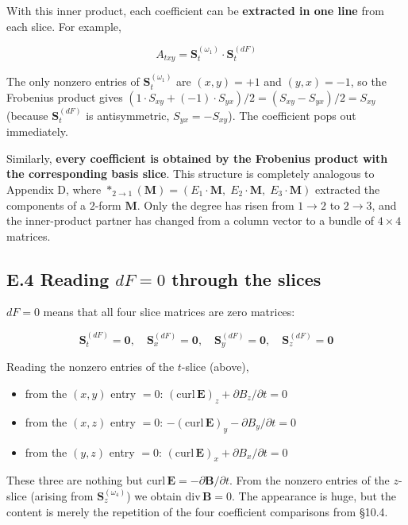 \documentclass[a4paper,12pt,openany]{book}
\begin{document}
With this inner product, each coefficient can be
\textbf{extracted in one line} from each slice. For example,

\[
A_{txy} = \mathbf{S}_{t}^{(\omega_1)} \cdot \mathbf{S}_{t}^{(dF)}
\]

The only nonzero entries of \(\mathbf{S}_{t}^{(\omega_1)}\) are
\((x,y)=+1\) and \((y,x)=-1\), so the Frobenius product gives
\((1 \cdot S_{xy} + (-1) \cdot S_{yx})/2 = (S_{xy} - S_{yx})/2 = S_{xy}\)
(because \(\mathbf{S}_{t}^{(dF)}\) is antisymmetric,
\(S_{yx}=-S_{xy}\)). The coefficient pops out immediately.

Similarly,
\textbf{every coefficient is obtained by the Frobenius product with the corresponding basis slice}.
This structure is completely analogous to Appendix D, where
\(\ast_{2\to1}(\mathbf{M}) = (E_1\!\cdot\!\mathbf{M},\;E_2\!\cdot\!\mathbf{M},\;E_3\!\cdot\!\mathbf{M})\)
extracted the components of a \(2\)-form \(\mathbf{M}\). Only the degree
has risen from \(1\to2\) to \(2\to3\), and the inner-product partner has
changed from a column vector to a bundle of \(4\times4\) matrices.

\hypertarget{e.4-reading-df0-through-the-slices}{%
\subsection*{\texorpdfstring{E.4 Reading \(dF=0\) through the
slices}{E.4 Reading dF=0 through the slices}}\label{e.4-reading-df0-through-the-slices}}

\(dF=0\) means that all four slice matrices are zero matrices:

\[
\mathbf{S}_{t}^{(dF)} = \mathbf{0},\quad
\mathbf{S}_{x}^{(dF)} = \mathbf{0},\quad
\mathbf{S}_{y}^{(dF)} = \mathbf{0},\quad
\mathbf{S}_{z}^{(dF)} = \mathbf{0}
\]

Reading the nonzero entries of the \(t\)-slice (above),

\begin{itemize}
\item
  from the \((x,y)\) entry \(=0\):
  \((\mathrm{curl}\,\mathbf{E})_z + \partial B_z/\partial t = 0\)
\item
  from the \((x,z)\) entry \(=0\):
  \(-(\mathrm{curl}\,\mathbf{E})_y - \partial B_y/\partial t = 0\)
\item
  from the \((y,z)\) entry \(=0\):
  \((\mathrm{curl}\,\mathbf{E})_x + \partial B_x/\partial t = 0\)
\end{itemize}

These three are nothing but
\(\mathrm{curl}\,\mathbf{E} = -\partial\mathbf{B}/\partial t\). From the
nonzero entries of the \(z\)-slice (arising from
\(\mathbf{S}_{z}^{(\omega_4)}\)) we obtain
\(\mathrm{div}\,\mathbf{B} = 0\). The appearance is huge, but the
content is merely the repetition of the four coefficient comparisons
from §10.4.
\end{document}
